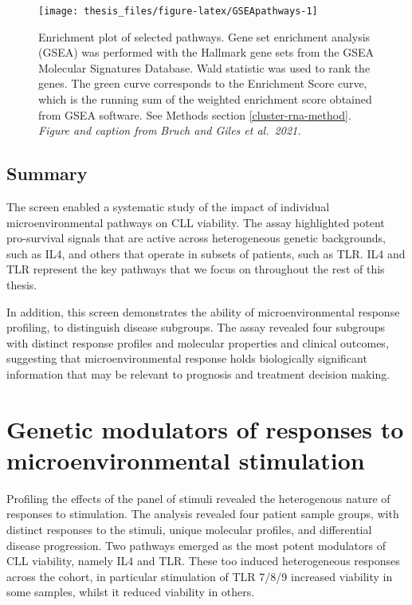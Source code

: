 \documentclass[11pt, a4paper, twosided]{book}
\begin{document}
\begin{figure}

{\centering \texttt{[image: thesis\_files/figure-latex/GSEApathways-1]} 

}

\caption{Enrichment plot of selected pathways. Gene set enrichment analysis (GSEA) was performed with the Hallmark gene sets from the GSEA Molecular Signatures Database. Wald statistic was used to rank the genes. The green curve corresponds to the Enrichment Score curve, which is the running sum of the weighted enrichment score obtained from GSEA software. See Methods section \ref{cluster-rna-method}. \emph{Figure and caption from Bruch and Giles et al.~2021.}}\label{fig:GSEApathways}
\end{figure}
\hypertarget{summary}{%
\section{Summary}\label{summary}}

The screen enabled a systematic study of the impact of individual microenvironmental pathways on CLL viability. The assay highlighted potent pro-survival signals that are active across heterogeneous genetic backgrounds, such as IL4, and others that operate in subsets of patients, such as TLR. IL4 and TLR represent the key pathways that we focus on throughout the rest of this thesis.

In addition, this screen demonstrates the ability of microenvironmental response profiling, to distinguish disease subgroups. The assay revealed four subgroups with distinct response profiles and molecular properties and clinical outcomes, suggesting that microenvironmental response holds biologically significant information that may be relevant to prognosis and treatment decision making.

\hypertarget{chapter5}{%
\chapter{Genetic modulators of responses to microenvironmental stimulation}\label{chapter5}}

Profiling the effects of the panel of stimuli revealed the heterogenous nature of responses to stimulation. The analysis revealed four patient sample groups, with distinct responses to the stimuli, unique molecular profiles, and differential disease progression. Two pathways emerged as the most potent modulators of CLL viability, namely IL4 and TLR. These too induced heterogeneous responses across the cohort, in particular stimulation of TLR 7/8/9 increased viability in some samples, whilst it reduced viability in others.
\end{document}
